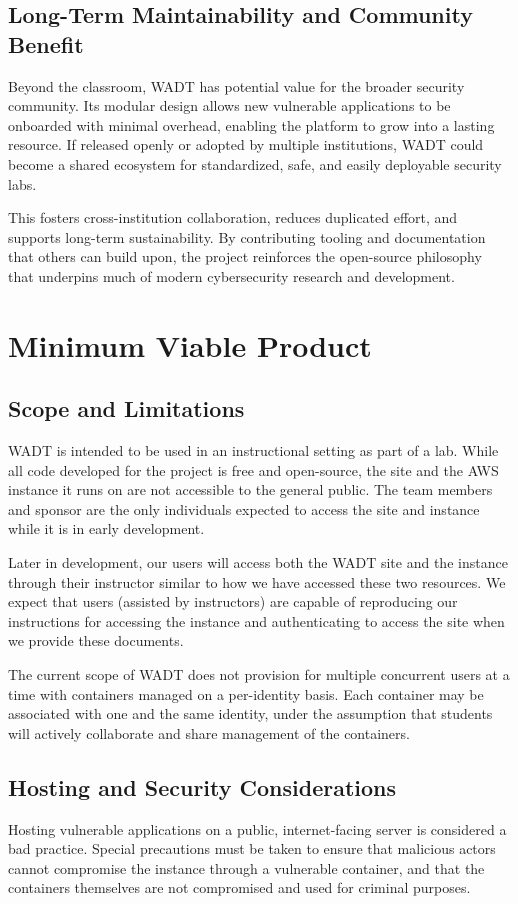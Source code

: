 \documentclass[12pt,titlepage]{article}
\begin{document}
\subsection{Long-Term Maintainability and Community Benefit}

Beyond the classroom, WADT has potential value for the broader security community. Its modular design allows new vulnerable applications to be onboarded with minimal overhead, enabling the platform to grow into a lasting resource. If released openly or adopted by multiple institutions, WADT could become a shared ecosystem for standardized, safe, and easily deployable security labs.

This fosters cross-institution collaboration, reduces duplicated effort, and supports long-term sustainability. By contributing tooling and documentation that others can build upon, the project reinforces the open-source philosophy that underpins much of modern cybersecurity research and development.

\section{Minimum Viable Product}

\subsection{Scope and Limitations}
WADT is intended to be used in an instructional setting as part of a lab. While all code developed for the project is free and open-source, the site and the AWS instance it runs on are not accessible to the general public. The team members and sponsor are the only individuals expected to access the site and instance while it is in early development.

Later in development, our users will access both the WADT site and the instance through their instructor similar to how we have accessed these two resources. We expect that users (assisted by instructors) are capable of reproducing our instructions for accessing the instance and authenticating to access the site when we provide these documents.

The current scope of WADT does not provision for multiple concurrent users at a time with containers managed on a per-identity basis. Each container may be associated with one and the same identity, under the assumption that students will actively collaborate and share management of the containers.

\subsection{Hosting and Security Considerations}
Hosting vulnerable applications on a public, internet-facing server is considered a bad practice. Special precautions must be taken to ensure that malicious actors cannot compromise the instance through a vulnerable container, and that the containers themselves are not compromised and used for criminal purposes.
\end{document}
